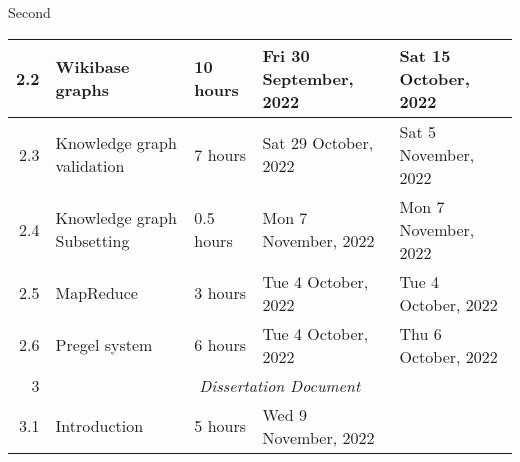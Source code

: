 Second\documentclass{standalone}
\begin{document}
\begin{tabular}{|r|llll|}
    2.2                                                           & \multicolumn{1}{l|}{Wikibase graphs}                            & \multicolumn{1}{l|}{10 hours}                                  & \multicolumn{1}{l|}{Fri 30 September, 2022}                 & Sat 15 October, 2022                                         \\ \hline
    2.3                                                           & \multicolumn{1}{l|}{Knowledge graph validation}                 & \multicolumn{1}{l|}{7 hours}                                   & \multicolumn{1}{l|}{Sat 29 October, 2022}                   & Sat 5 November, 2022                                         \\ \hline
    2.4                                                           & \multicolumn{1}{l|}{Knowledge graph Subsetting}                 & \multicolumn{1}{l|}{0.5 hours}                                 & \multicolumn{1}{l|}{Mon 7 November, 2022}                   & Mon 7 November, 2022                                         \\ \hline
    2.5                                                           & \multicolumn{1}{l|}{MapReduce}                                  & \multicolumn{1}{l|}{3 hours}                                   & \multicolumn{1}{l|}{Tue 4 October, 2022}                    & Tue 4 October, 2022                                          \\ \hline
    2.6                                                           & \multicolumn{1}{l|}{Pregel system}                           & \multicolumn{1}{l|}{6 hours}                                   & \multicolumn{1}{l|}{Tue 4 October, 2022}                    & Thu 6 October, 2022                                          \\ \hline
    3                                                             & \multicolumn{4}{c|}{\textit{Dissertation Document}}                                                                                                                                                                                                           \\ \hline
    3.1                                                           & \multicolumn{1}{l|}{Introduction}                               & \multicolumn{1}{l|}{5 hours}                                   & \multicolumn{1}{l|}{Wed 9 November, 2022}                   &                                                              \\ \hline

\end{tabular}
\end{document}
